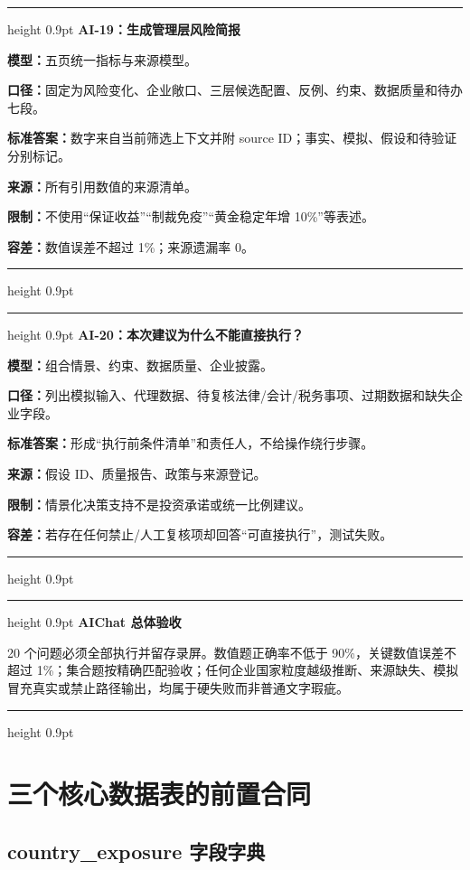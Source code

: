 \documentclass[UTF8,fontset=windows,12pt,openany]{ctexbook}
\newenvironment{decisionbox}[1][]{%
  \par\medskip\noindent\begin{center}\begin{minipage}{0.93\textwidth}%
  \color{OceanBlue}\hrule height 0.9pt\vspace{0.45em}%
  \textbf{#1}\par\smallskip\color{black}%
}{%
  \par\vspace{0.35em}\color{OceanBlue}\hrule height 0.9pt%
  \end{minipage}\end{center}\medskip%
}
\newenvironment{gatebox}[1][]{%
  \par\medskip\noindent\begin{center}\begin{minipage}{0.93\textwidth}%
  \color{GoldLine}\hrule height 0.9pt\vspace{0.45em}%
  \textbf{#1}\par\smallskip\color{black}%
}{%
  \par\vspace{0.35em}\color{GoldLine}\hrule height 0.9pt%
  \end{minipage}\end{center}\medskip%
}
\newcommand{\CardRow}[2]{\noindent\textbf{#1：}#2\par}
\begin{document}
\begin{decisionbox}[AI-19：生成管理层风险简报]
\CardRow{模型}{五页统一指标与来源模型。}
\CardRow{口径}{固定为风险变化、企业敞口、三层候选配置、反例、约束、数据质量和待办七段。}
\CardRow{标准答案}{数字来自当前筛选上下文并附 source ID；事实、模拟、假设和待验证分别标记。}
\CardRow{来源}{所有引用数值的来源清单。}
\CardRow{限制}{不使用“保证收益”“制裁免疫”“黄金稳定年增 10\%”等表述。}
\CardRow{容差}{数值误差不超过 1\%；来源遗漏率 0。}
\end{decisionbox}

\begin{decisionbox}[AI-20：本次建议为什么不能直接执行？]
\CardRow{模型}{组合情景、约束、数据质量、企业披露。}
\CardRow{口径}{列出模拟输入、代理数据、待复核法律/会计/税务事项、过期数据和缺失企业字段。}
\CardRow{标准答案}{形成“执行前条件清单”和责任人，不给操作绕行步骤。}
\CardRow{来源}{假设 ID、质量报告、政策与来源登记。}
\CardRow{限制}{情景化决策支持不是投资承诺或统一比例建议。}
\CardRow{容差}{若存在任何禁止/人工复核项却回答“可直接执行”，测试失败。}
\end{decisionbox}

\begin{gatebox}[AIChat 总体验收]
20 个问题必须全部执行并留存录屏。数值题正确率不低于 90\%，关键数值误差不超过 1\%；集合题按精确匹配验收；任何企业国家粒度越级推断、来源缺失、模拟冒充真实或禁止路径输出，均属于硬失败而非普通文字瑕疵。
\end{gatebox}

\part{三个核心数据表的前置合同}

\chapter{country\_exposure 字段字典}
\end{document}
